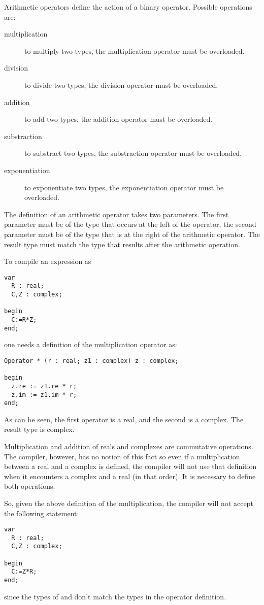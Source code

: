 \documentclass{report}
\begin{document}
Arithmetic operators define the action of a binary operator. Possible 
operations are:
\begin{description}
\item[multiplication] to multiply two types, the \var{*} multiplication
operator must be overloaded.
\item[division] to divide two types, the \var{/} division
operator must be overloaded.
\item[addition] to add two types, the \var{+} addition
operator must be overloaded.
\item[substraction] to substract two types, the \var{-} substraction
operator must be overloaded.
\item[exponentiation] to exponentiate two types, the \var{**} exponentiation
operator must be overloaded.
\end{description}

The definition of an arithmetic operator takes two parameters. The first
parameter must be of the type that occurs at the left of the operator, 
the second parameter must be of the type that is at the right of the
arithmetic operator. The result type must match the type that results
after the arithmetic operation.

To compile an expression as
\begin{verbatim}
var 
  R : real;
  C,Z : complex;

begin
  C:=R*Z;
end;
\end{verbatim}
one needs a definition of the multiplication operator as:
\begin{verbatim}
Operator * (r : real; z1 : complex) z : complex;
 
begin
  z.re := z1.re * r;
  z.im := z1.im * r;
end;
\end{verbatim}
As can be seen, the first operator is a real, and the second is
a complex. The result type is complex.

Multiplication and addition of reals and complexes are commutative 
operations. The compiler, however, has no notion of this fact so even 
if a multiplication between a real and a complex is defined, the 
compiler will not use that definition when it encounters a complex 
and a real (in that order). It is necessary to define both operations.

So, given the above definition of the multiplication, 
the compiler will not accept the following statement:
\begin{verbatim}
var 
  R : real;
  C,Z : complex;

begin
  C:=Z*R;
end;
\end{verbatim}
since the types of  and  don't match the types in the
operator definition.
\end{document}
